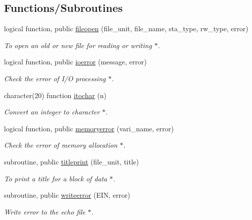 \subsection*{Functions/\+Subroutines}
\begin{DoxyCompactItemize}
\item 
logical function, public \hyperlink{namespaceglobaldatafun_a384e8e6270f765a8e68a8c65ac8ae9d6}{fileopen} (file\+\_\+unit, file\+\_\+name, sta\+\_\+type, rw\+\_\+type, error)
\begin{DoxyCompactList}\small\item\em To open an old or new file for reading or writing $\ast$. \end{DoxyCompactList}\item 
logical function, public \hyperlink{namespaceglobaldatafun_a84403b06e98cfc25fc1fb6222884a30d}{ioerror} (message, error)
\begin{DoxyCompactList}\small\item\em Check the error of I/O processing $\ast$. \end{DoxyCompactList}\item 
character(20) function \hyperlink{namespaceglobaldatafun_ae970761ddf59b4acff02030b21dbcd75}{itochar} (n)
\begin{DoxyCompactList}\small\item\em Convert an integer to character $\ast$. \end{DoxyCompactList}\item 
logical function, public \hyperlink{namespaceglobaldatafun_af28c2b9df0d5a1ef886c3d242fc15205}{memoryerror} (vari\+\_\+name, error)
\begin{DoxyCompactList}\small\item\em Check the error of memory allocation $\ast$. \end{DoxyCompactList}\item 
subroutine, public \hyperlink{namespaceglobaldatafun_a74b07978d9a6c644031fbb37b131f609}{titleprint} (file\+\_\+unit, title)
\begin{DoxyCompactList}\small\item\em To print a title for a block of data $\ast$. \end{DoxyCompactList}\item 
subroutine, public \hyperlink{namespaceglobaldatafun_ab8bdea863cb470f4098dbfd74bd27faa}{writeerror} (E\+IN, error)
\begin{DoxyCompactList}\small\item\em Write error to the echo file $\ast$. \end{DoxyCompactList}\item 

\end{DoxyCompactItemize}
